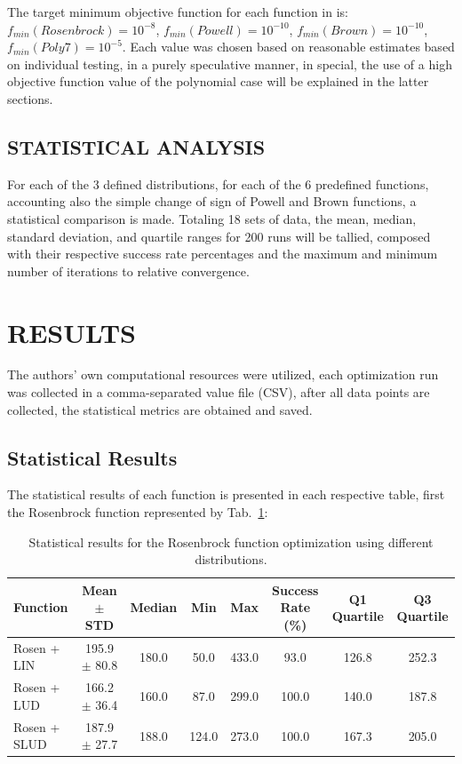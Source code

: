 \documentclass[10pt,fleqn,a4paper,twoside]{article}
\begin{document}
The target minimum objective function for each function in is: $f_{min}(Rosenbrock) = 10^{-8}$, $f_{min}(Powell) = 10^{-10}$, $f_{min}(Brown) = 10^{-10}$, $f_{min}(Poly7) =  10^{-5}$. Each value was chosen based 
on reasonable estimates based on individual testing, in a purely speculative manner, in special, the use of a high objective function value of the polynomial case will be explained
in the latter sections.

\subsection{STATISTICAL ANALYSIS}

For each of the 3 defined distributions, for each of the 6 predefined functions, accounting also the simple change of sign of Powell and Brown functions, a statistical comparison is made.
Totaling 18 sets of data, the mean, median, standard deviation, and quartile ranges for 200 runs will be tallied, composed with their respective success rate percentages and the maximum and minimum 
number of iterations to relative convergence. 

\section{RESULTS}

The authors' own computational resources were utilized, each optimization run was collected in a comma-separated value file (CSV), after all data points are collected, the statistical metrics
are obtained and saved.%

\subsection{Statistical Results}

The statistical results of each function is presented in each respective table, first the Rosenbrock function represented by Tab.~\ref{Tab:1}:


\begin{table}[H]
\centering
\caption{Statistical results for the Rosenbrock function optimization using different distributions.}
\label{Tab:1}
\begin{tabular}{l|c|c|c|c|c|c|c}
\hline
\textbf{Function} & \textbf{Mean $\pm$ STD} & \textbf{Median} & \textbf{Min} & \textbf{Max} & \textbf{Success Rate (\%)} & \textbf{Q1 Quartile} & \textbf{Q3 Quartile}\\
\hline
Rosen + LIN            & 195.9 $\pm$ 80.8      & 180.0 & 50.0 & 433.0 & 93.0 & 126.8 & 252.3\\
Rosen + LUD            & 166.2 $\pm$ 36.4      & 160.0 & 87.0 & 299.0 & 100.0 & 140.0 & 187.8\\
Rosen + SLUD           & 187.9 $\pm$ 27.7      & 188.0 & 124.0 & 273.0 & 100.0 & 167.3 & 205.0\\
\hline
\end{tabular}
\end{table}
\end{document}
